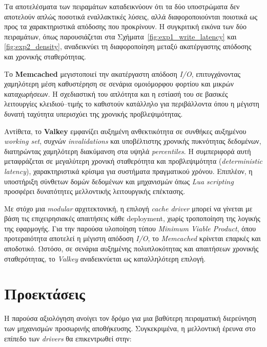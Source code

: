 Τα αποτελέσματα των πειραμάτων καταδεικνύουν ότι τα δύο υποστρώματα δεν
αποτελούν απλώς ποσοτικά εναλλακτικές λύσεις, αλλά διαφοροποιούνται ποιοτικά ως
προς τα χαρακτηριστικά απόδοσης που προκρίνουν. Η συγκριτική εικόνα των δύο
πειραμάτων, όπως παρουσιάζεται στα Σχήματα~\ref{fig:exp1_write_latency}
και
\ref{fig:exp2_density},
αναδεικνύει τη διαφοροποίηση μεταξύ ακατέργαστης απόδοσης και χρονικής
σταθερότητας.

Το \textbf{Memcached} μεγιστοποιεί την ακατέργαστη απόδοση \textit{I/O},
επιτυγχάνοντας χαμηλότερη μέση καθυστέρηση σε σενάρια ομοιόμορφου φορτίου και
μικρών καταχωρήσεων. Η σχεδιαστική του απλότητα και η εστίασή του σε βασικές
λειτουργίες κλειδιού--τιμής το καθιστούν κατάλληλο για περιβάλλοντα όπου η
μέγιστη δυνατή ταχύτητα υπερισχύει της χρονικής προβλεψιμότητας.

Αντίθετα, το \textbf{Valkey} εμφανίζει αυξημένη ανθεκτικότητα σε συνθήκες
αυξημένου \textit{working set}, συχνών \textit{invalidations} και υποβέλτιστης
χρονικής πυκνότητας δεδομένων, διατηρώντας χαμηλότερη διακύμανση στα υψηλά
\textit{percentiles}. Η συμπεριφορά αυτή μεταφράζεται σε μεγαλύτερη χρονική
σταθερότητα και προβλεψιμότητα (\textit{deterministic latency}), χαρακτηριστικά
κρίσιμα για συστήματα πραγματικού χρόνου. Επιπλέον, η υποστήριξη σύνθετων δομών
δεδομένων και μηχανισμών όπως \textit{Lua scripting} προσφέρει δυνατότητες
μελλοντικής λειτουργικής επέκτασης.

Με στόχο μια \textit{modular} αρχιτεκτονική, η επιλογή \textit{cache driver}
μπορεί να γίνεται με βάση τις επιχειρησιακές απαιτήσεις κάθε deployment, χωρίς
τροποποίηση της λογικής της εφαρμογής. Για την παρούσα υλοποίηση τύπου
\textit{Minimum Viable Product}, όπου προτεραιότητα αποτελεί η μέγιστη απόδοση
\textit{I/O}, το \textit{Memcached} κρίνεται επαρκές και αποδοτικό. Ωστόσο, σε
σενάρια αυξημένης πολυπλοκότητας και απαιτήσεων χρονικής σταθερότητας, το
\textit{Valkey} αναδεικνύεται ως καταλληλότερη επιλογή.

\section{Προεκτάσεις}

Η παρούσα αξιολόγηση ανοίγει τον δρόμο για μια βαθύτερη πειραματική διερεύνηση
των μηχανισμών προσωρινής αποθήκευσης. Συγκεκριμένα, η μελλοντική έρευνα στο
επίπεδο των \textit{drivers} θα επικεντρωθεί στην:

